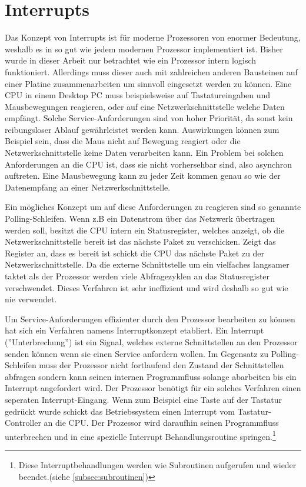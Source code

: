 \documentclass[12pt]{article}
\begin{document}
\section{Interrupts}
Das Konzept von Interrupts ist für moderne Prozessoren von enormer Bedeutung, weshalb es in so gut wie jedem modernen Prozessor implementiert ist. Bisher wurde in dieser Arbeit nur betrachtet wie ein Prozessor intern logisch funktioniert. Allerdings muss dieser auch mit zahlreichen anderen Bausteinen auf einer Platine zusammenarbeiten um sinnvoll eingesetzt werden zu können. Eine CPU in einem Desktop PC muss beispielsweise auf Tastatureingaben und Mausbewegungen reagieren, oder auf eine Netzwerkschnittstelle welche Daten empfängt. Solche Service-Anforderungen sind von hoher Priorität, da sonst kein reibungsloser Ablauf gewährleistet werden kann. Auswirkungen können zum Beispiel sein, dass die Maus nicht auf Bewegung reagiert oder die Netzwerkschnittstelle keine Daten verarbeiten kann. Ein Problem bei solchen Anforderungen an die CPU ist, dass sie nicht vorhersehbar sind, also asynchron auftreten. Eine Mausbewegung kann zu jeder Zeit kommen genau so wie der Datenempfang an einer Netzwerkschnittstelle. \cite[S.112ff]{mikroprozessortechnik2011}
\par\bigskip
\noindent Ein mögliches Konzept um auf diese Anforderungen zu reagieren sind so genannte Polling-Schleifen. Wenn z.B ein Datenstrom über das Netzwerk übertragen werden soll, besitzt die CPU intern ein Statusregister, welches anzeigt, ob die Netzwerkschnittstelle bereit ist das nächste Paket zu verschicken. Zeigt das Register an, dass es bereit ist schickt die CPU das nächste Paket zu der Netzwerkschnittstelle. Da die externe Schnittstelle um ein vielfaches langsamer taktet als der Prozessor werden viele Abfragezyklen an das Statusregister verschwendet. Dieses Verfahren ist sehr ineffizient und wird deshalb so gut wie nie verwendet. \cite{mikroprozessortechnik2011}
\par 
\noindent Um Service-Anforderungen effizienter durch den Prozessor bearbeiten zu können hat sich ein Verfahren namens Interruptkonzept etabliert. Ein Interrupt (''Unterbrechung'') ist ein Signal, welches externe Schnittstellen an den Prozessor senden können wenn sie einen Service anfordern wollen. Im Gegensatz zu Polling-Schleifen muss der Prozessor nicht fortlaufend den Zustand der Schnittstellen abfragen sondern kann seinen internen Programmfluss solange abarbeiten bis ein Interrupt angefordert wird. Der Prozessor benötigt für ein solches Verfahren einen seperaten Interrupt-Eingang. Wenn zum Beispiel eine Taste auf der Tastatur gedrückt wurde schickt das Betriebssystem einen Interrupt vom Tastatur-Controller an die CPU. Der Prozessor wird daraufhin seinen Programmfluss unterbrechen und in eine spezielle Interrupt Behandlungsroutine springen.\footnote{Diese Interruptbehandlungen werden wie Subroutinen aufgerufen und wieder beendet.(siehe \ref{subsec:subroutinen})}
\end{document}
